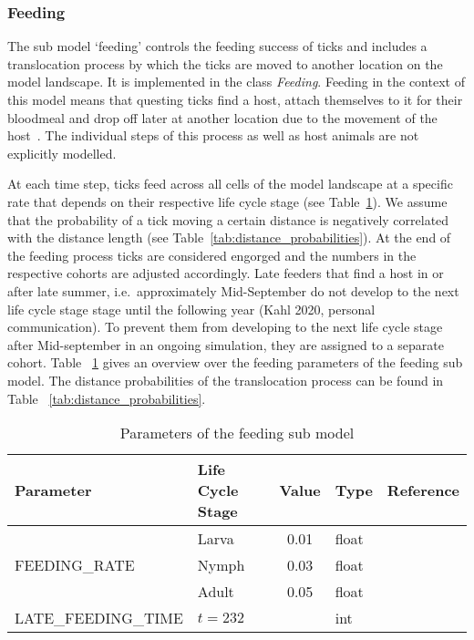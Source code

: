 \documentclass[a4paper, 11pt]{scrartcl}
\begin{document}
\subsubsection{Feeding}
The sub model `feeding' controls the feeding success of ticks and includes a translocation process by which the ticks are moved to another location on the model landscape.
It is implemented in the class \textit{Feeding}. Feeding in the context of this model means that questing ticks find a host, attach themselves to it for their bloodmeal and
drop off later at another location due to the movement of the host~\parencite{Medlock.2013}. The individual steps of this process as well as host animals are not explicitly
modelled.

At each time step, ticks feed across all cells of the model landscape at a specific rate that depends on their respective life cycle stage (see
Table~\ref{tab:feeding_parameters}). We assume that the probability of a tick moving a certain distance is negatively correlated with the distance length (see
Table~\ref{tab:distance_probabilities}). At the end of the feeding process ticks are considered engorged and the numbers in the respective cohorts are adjusted accordingly.
Late feeders that find a host in or after late summer, i.e.\ approximately Mid-September do not develop to the next life cycle stage stage until the following year (Kahl 2020,
personal communication). To prevent them from developing to the next life cycle stage after Mid-september in an ongoing simulation, they are assigned to a separate cohort. Table
~\ref{tab:feeding_parameters} gives an overview over the feeding parameters of the feeding sub model. The distance probabilities of the translocation process can be found
in Table ~\ref{tab:distance_probabilities}.


\begin{table}[h!]
\caption{Parameters of the feeding sub model}
\label{tab:feeding_parameters}
\begin{tabular}{@{}llcll@{}}
\toprule
\textbf{Parameter} & \textbf{Life Cycle Stage} & \textbf{Value} & \textbf{Type}	& \textbf{Reference} \\
\midrule
\multirow{3}{*}{\tiny{FEEDING\_RATE}} & Larva	& 0.01	& float	 & 		\\
									  & Nymph	& 0.03	& float	 &		\\
									  & Adult	& 0.05	& float	 &		\\

\tiny{LATE\_FEEDING\_TIME}			  &  $t = 232$  &	& int	 & ~\cite{tba}  \\
\bottomrule
\end{tabular}
\end{table}
\end{document}
